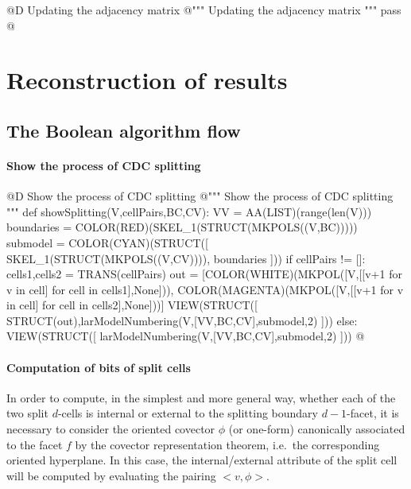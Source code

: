 \documentclass[11pt,oneside]{article}	%
\begin{document}
@D Updating the adjacency matrix
@{""" Updating the adjacency matrix """
pass
@}


\section{Reconstruction of results}


\subsection{The Boolean algorithm flow}


\paragraph{Show the process of CDC splitting}

@D Show the process of CDC splitting
@{""" Show the process of CDC splitting """
def showSplitting(V,cellPairs,BC,CV):
	VV = AA(LIST)(range(len(V)))
	boundaries = COLOR(RED)(SKEL_1(STRUCT(MKPOLS((V,BC)))))
	submodel = COLOR(CYAN)(STRUCT([ SKEL_1(STRUCT(MKPOLS((V,CV)))), boundaries ]))
	if cellPairs != []:
		cells1,cells2 = TRANS(cellPairs)
		out = [COLOR(WHITE)(MKPOL([V,[[v+1 for v in cell] for cell in cells1],None])), 
				COLOR(MAGENTA)(MKPOL([V,[[v+1 for v in cell] for cell in cells2],None]))]
		VIEW(STRUCT([ STRUCT(out),larModelNumbering(V,[VV,BC,CV],submodel,2) ]))
	else:
		VIEW(STRUCT([ larModelNumbering(V,[VV,BC,CV],submodel,2) ]))
@}



\paragraph{Computation of bits of split cells}

In order to compute, in the simplest and more general way, whether each of the two split $d$-cells is internal or external to the splitting boundary $d-1$-facet, it is necessary to consider the oriented covector $\phi$ (or one-form) canonically associated to the facet $f$ by the covector representation theorem, i.e.~the corresponding oriented hyperplane. In this case, the internal/external attribute of the split cell will be computed by evaluating the pairing $<v,\phi>$.
\end{document}
